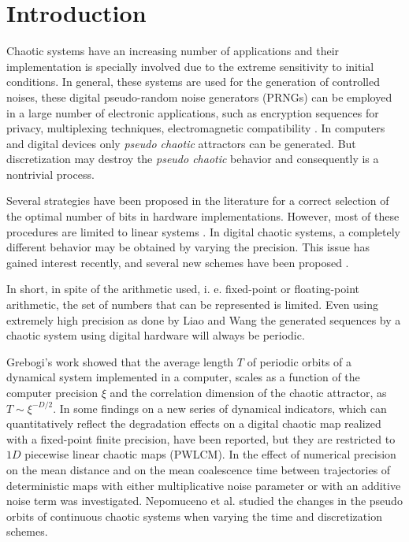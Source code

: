 \section{Introduction} \label{sec:intro}

Chaotic systems have an increasing number of applications and their implementation is specially involved due to the extreme sensitivity to initial conditions. In general, 
these systems are used for the generation of controlled noises, these digital pseudo-random noise generators (PRNGs) 
can be employed in a large number of electronic applications, such as encryption sequences for privacy, multiplexing techniques, 
electromagnetic compatibility \cite{Machado2004,Smaoui2009,DeMicco2007A,DeMicco2007C,DeMicco2007B}. In computers and digital devices only \textsl{pseudo chaotic} attractors can be generated. But discretization may destroy the \textsl{pseudo chaotic} behavior and consequently is a nontrivial process.

Several strategies have been proposed in the literature for a correct
selection of the optimal number of bits in hardware
implementations. However, most of these procedures are limited to linear systems
\cite{Constantinides2002,Constantinides2003}. In digital
chaotic systems, a completely different behavior may be obtained by
varying the precision.  This issue  has gained interest recently,
and several new schemes have been proposed
\cite{Ding2007,Asseri2002,Azzaz2009}.

In short, in spite of the arithmetic used, i. e. fixed-point or floating-point arithmetic, the set of numbers that can be represented is limited. 
Even using extremely high precision as done by Liao and Wang \cite{Liao2013a} the generated sequences by a chaotic system using digital hardware will always be periodic.

Grebogi's work \cite{Grebogi1988} showed that the average
length $T$  of periodic orbits of a dynamical system implemented in a computer, scales as a
function of the computer precision $\xi$  and the correlation dimension
 of the chaotic attractor, as $T \sim  \xi^{-D/2}$. In
\cite{SHUJUN2005} some findings on a new series of dynamical
indicators, which can quantitatively reflect the degradation
effects on a digital chaotic map realized with a fixed-point
finite precision, have been reported, but they are restricted to $1D$
piecewise linear chaotic maps (PWLCM). In \cite{Dias2011} the effect of numerical precision on the mean
distance and on the mean coalescence time between trajectories of deterministic maps with either multiplicative noise parameter or with an additive noise term was investigated. Nepomuceno et al. \cite{Nepomuceno2017} studied the changes in the pseudo orbits of continuous chaotic systems when varying the time and discretization schemes.

